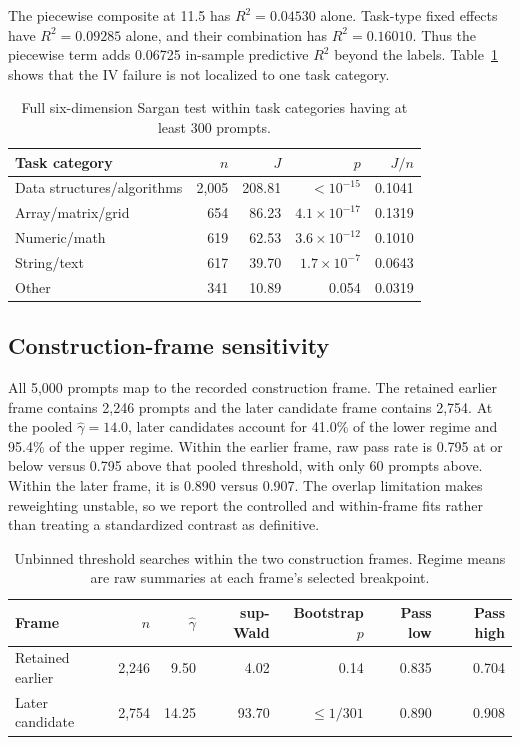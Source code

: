 \documentclass{article}
\begin{document}
The piecewise composite at 11.5 has $R^2=0.04530$ alone. Task-type fixed effects have $R^2=0.09285$ alone, and their combination has $R^2=0.16010$. Thus the piecewise term adds 0.06725 in-sample predictive $R^2$ beyond the labels. Table~\ref{tab:within-type-j} shows that the IV failure is not localized to one task category.

\begin{table}[h]
\centering
\caption{Full six-dimension Sargan test within task categories having at least 300 prompts.}
\label{tab:within-type-j}
\begin{tabular}{@{}lrrrr@{}}
\toprule
Task category & $n$ & $J$ & $p$ & $J/n$ \\
\midrule
Data structures/algorithms & 2{,}005 & 208.81 & $<10^{-15}$ & 0.1041 \\
Array/matrix/grid          & 654     & 86.23  & $4.1\times10^{-17}$ & 0.1319 \\
Numeric/math               & 619     & 62.53  & $3.6\times10^{-12}$ & 0.1010 \\
String/text                & 617     & 39.70  & $1.7\times10^{-7}$  & 0.0643 \\
Other                      & 341     & 10.89  & 0.054 & 0.0319 \\
\bottomrule
\end{tabular}
\end{table}

\subsection{Construction-frame sensitivity}

All 5{,}000 prompts map to the recorded construction frame. The retained earlier frame contains 2{,}246 prompts and the later candidate frame contains 2{,}754. At the pooled $\hat{\gamma}=14.0$, later candidates account for 41.0\% of the lower regime and 95.4\% of the upper regime. Within the earlier frame, raw pass rate is 0.795 at or below versus 0.795 above that pooled threshold, with only 60 prompts above. Within the later frame, it is 0.890 versus 0.907. The overlap limitation makes reweighting unstable, so we report the controlled and within-frame fits rather than treating a standardized contrast as definitive.

\begin{table}[h]
\centering
\caption{Unbinned threshold searches within the two construction frames. Regime means are raw summaries at each frame's selected breakpoint.}
\label{tab:source-frame}
\begin{tabular}{@{}lrrrrrr@{}}
\toprule
Frame & $n$ & $\hat{\gamma}$ & sup-Wald & Bootstrap $p$ & Pass low & Pass high \\
\midrule
Retained earlier & 2{,}246 & 9.50 & 4.02 & 0.14 & 0.835 & 0.704 \\
Later candidate & 2{,}754 & 14.25 & 93.70 & $\leq1/301$ & 0.890 & 0.908 \\
\bottomrule
\end{tabular}
\end{table}
\end{document}

